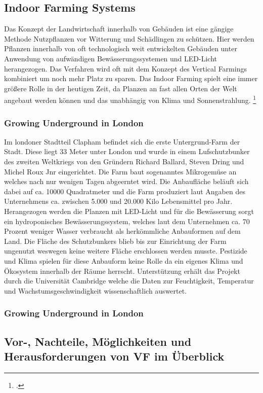\documentclass{scrartcl}
\begin{document}
\subsection{Indoor Farming Systems}

Das Konzept der Landwirtschaft innerhalb von Gebäuden ist eine gängige Methode Nutzpflanzen vor Witterung und Schädlingen zu schützen. Hier werden Pflanzen innerhalb von oft technologisch weit entwickelten Gebäuden unter Anwendung von aufwändigen Bewässerungssystemen und LED-Licht herangezogen. Das Verfahren wird oft mit dem Konzept des Vertical Farmings kombiniert um noch mehr Platz zu sparen. Das Indoor Farming spielt eine immer größere Rolle in der heutigen Zeit, da Planzen an fast allen Orten der Welt angebaut werden können und das unabhängig von Klima und Sonnenstrahlung. \footcite[14.10.2018]{ACHTUNG}

\subsubsection{Growing Underground in London}

Im londoner Stadtteil Clapham befindet sich die erste Untergrund-Farm der Stadt. Diese liegt 33 Meter unter London und wurde in einem Lufschutzbunker des zweiten Weltkriegs von den Gründern  Richard Ballard, Steven Dring und Michel Roux Jnr eingerichtet. Die Farm baut sogenanntes Mikrogemüse an welches nach nur wenigen Tagen abgeerntet wird. Die Anbaufläche beläuft sich dabei auf ca. 10000 Quadratmeter und die Farm produziert laut Angaben des Unternehmens ca. zwischen 5.000 und 20.000 Kilo Lebensmittel pro Jahr. Herangezogen werden die Planzen mit LED-Licht und für die Bewässerung sorgt ein hydroponisches Bewässerungssystem, welches laut dem Unternehmen ca. 70 Prozent weniger Wasser verbraucht als herkömmliche Anbauformen auf dem Land. Die Fläche des Schutzbunkers blieb bis zur Einrichtung der Farm ungenutzt weswegen keine weitere Fläche erschlossen werden musste. Pestizide und Klima spielen für diese Anbauform keine Rolle da ein eigenes Klima und Ökosystem innerhalb der Räume herrscht. Unterstützung erhält das Projekt durch die Universität Cambridge welche die Daten zur Feuchtigkeit, Temperatur und Wachstumsgeschwindigkeit wissenschaftlich auswertet.

\subsubsection{Growing Underground in London}

\subsection {Vor-, Nachteile, Möglichkeiten und Herausforderungen von VF im Überblick}
\end{document}

